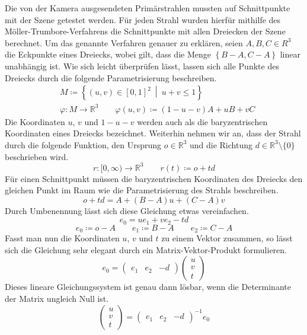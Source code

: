 \documentclass[crop=false]{standalone}
\begin{document}
      Die von der Kamera ausgesendeten Primärstrahlen mussten auf Schnittpunkte mit der Szene getestet werden.
      Für jeden Strahl wurden hierfür mithilfe des Möller-Trumbore-Verfahrens die Schnittpunkte mit allen Dreiecken der Szene berechnet.
      Um das genannte Verfahren genauer zu erklären, seien $A,B,C\in R^3$ die Eckpunkte eines Dreiecks, wobei gilt, dass die Menge $\left\{ B-A,C-A \right\}$ linear unabhängig ist.
      Wie sich leicht überprüfen lässt, lassen sich alle Punkte des Dreiecks durch die folgende Parametrisierung beschreiben.
      \begin{align*}
        &M \coloneqq \left\{ (u,v)\in [0,1]^2 \ \middle|\ u+v \leq 1 \right\} \\
        &\varphi\colon M\to \mathds{R}^3 \qquad \varphi(u,v)\coloneqq (1-u-v)A + uB + vC
      \end{align*}
      Die Koordinaten $u$, $v$ und $1-u-v$ werden auch als die baryzentrischen Koordinaten eines Dreiecks bezeichnet.
      Weiterhin nehmen wir an, dass der Strahl durch die folgende Funktion, den Ursprung $o\in\mathds{R}^3$ und die Richtung $d\in\mathds{R}^3\setminus\{0\}$ beschrieben wird.
      \[
        r\colon [0,\infty) \to \mathds{R}^3
        \qquad
        r(t) \coloneqq o + td
      \]
      Für einen Schnittpunkt müssen die baryzentrischen Koordinaten des Dreiecks den gleichen Punkt im Raum wie die Parametrisierung des Strahls beschreiben.
      \[
        o + td = A + (B-A)u + (C-A)v
      \]
      Durch Umbenennung lässt sich diese Gleichung etwas vereinfachen.
      \[
        e_0 = ue_1 + ve_2 - td
      \]
      \[
        e_0 \coloneqq o - A
        \qquad
        e_1 \coloneqq B-A
        \qquad
        e_2 \coloneqq C-A
      \]
      Fasst man nun die Koordinaten $u$, $v$ und $t$ zu einem Vektor zusammen, so lässt sich die Gleichung sehr elegant durch ein Matrix-Vektor-Produkt formulieren.
      \[
        e_0 =
        \begin{pmatrix}
          e_1 &
          e_2 &
          -d
        \end{pmatrix}
        \begin{pmatrix}
          u \\
          v \\
          t
        \end{pmatrix}
      \]
      Dieses lineare Gleichungssystem ist genau dann lösbar, wenn die Determinante der Matrix ungleich Null ist.
      \[
        \begin{pmatrix}
          u \\
          v \\
          t
        \end{pmatrix}
        =
        \begin{pmatrix}
          e_1 &
          e_2 &
          -d
        \end{pmatrix}^{-1}
        e_0
      \]
\end{document}
